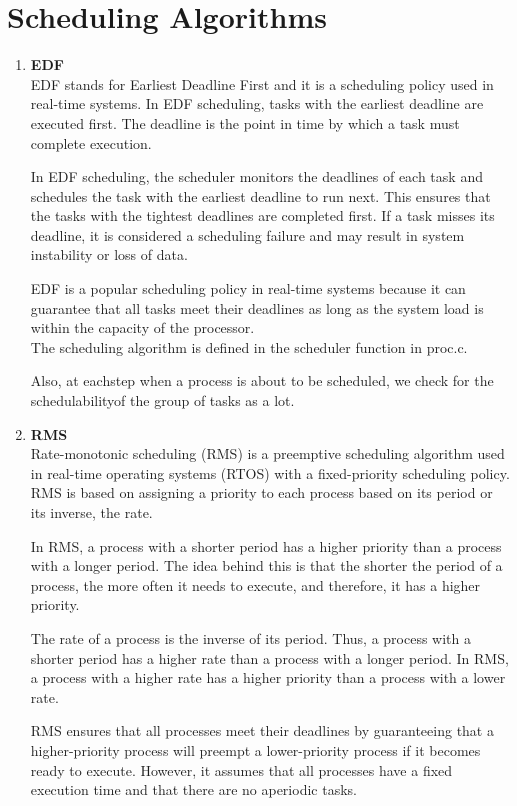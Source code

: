\documentclass{article}
\begin{document}
\section{Scheduling Algorithms}
\begin{enumerate}
    \item \textbf{EDF} \\   EDF stands for Earliest Deadline First and it is a scheduling policy used in real-time systems. In EDF scheduling, tasks with the earliest deadline are executed first. The deadline is the point in time by which a task must complete execution.

In EDF scheduling, the scheduler monitors the deadlines of each task and schedules the task with the earliest deadline to run next. This ensures that the tasks with the tightest deadlines are completed first. If a task misses its deadline, it is considered a scheduling failure and may result in system instability or loss of data.

EDF is a popular scheduling policy in real-time systems because it can guarantee that all tasks meet their deadlines as long as the system load is within the capacity of the processor.
\\ The scheduling algorithm is defined in the scheduler function in proc.c. 

Also, at eachstep when a process is about to be scheduled, we check for the schedulabilityof the group of tasks as a lot.
\item \textbf{RMS} \\  Rate-monotonic scheduling (RMS) is a preemptive scheduling algorithm used in real-time operating systems (RTOS) with a fixed-priority scheduling policy. RMS is based on assigning a priority to each process based on its period or its inverse, the rate.

In RMS, a process with a shorter period has a higher priority than a process with a longer period. The idea behind this is that the shorter the period of a process, the more often it needs to execute, and therefore, it has a higher priority.

The rate of a process is the inverse of its period. Thus, a process with a shorter period has a higher rate than a process with a longer period. In RMS, a process with a higher rate has a higher priority than a process with a lower rate.

RMS ensures that all processes meet their deadlines by guaranteeing that a higher-priority process will preempt a lower-priority process if it becomes ready to execute. However, it assumes that all processes have a fixed execution time and that there are no aperiodic tasks.
\end{enumerate}
\end{document}
